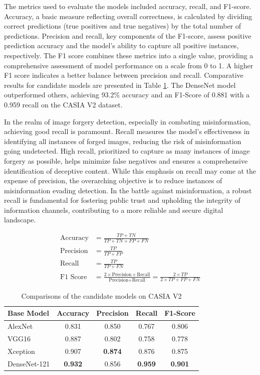The metrics used to evaluate the models included accuracy, recall, and F1-score. Accuracy, a basic measure reflecting overall correctness, is calculated by dividing correct predictions (true positives and true negatives) by the total number of predictions. Precision and recall, key components of the F1-score, assess positive prediction accuracy and the model's ability to capture all positive instances, respectively. The F1 score combines these metrics into a single value, providing a comprehensive assessment of model performance on a scale from 0 to 1. A higher F1 score indicates a better balance between precision and recall. Comparative results for candidate models are presented in Table \ref{table:Candidates}. The DenseNet model outperformed others, achieving 93.2\% accuracy and an F1-Score of 0.881 with a 0.959 recall on the CASIA V2 dataset.

In the realm of image forgery detection, especially in combating misinformation, achieving good recall is paramount. Recall measures the model's effectiveness in identifying all instances of forged images, reducing the risk of misinformation going undetected. High recall, prioritized to capture as many instances of image forgery as possible, helps minimize false negatives and ensures a comprehensive identification of deceptive content. While this emphasis on recall may come at the expense of precision, the overarching objective is to reduce instances of misinformation evading detection. In the battle against misinformation, a robust recall is fundamental for fostering public trust and upholding the integrity of information channels, contributing to a more reliable and secure digital landscape.


\begin{align*}
\text{Accuracy} & = \frac{TP + TN}{TP + TN + FP + FN} \\
\text{Precision} & = \frac{TP}{TP + FP} \\
\text{Recall} & = \frac{TP}{TP + FN} \\
\text{F1 Score} & = \frac{2 \times \text{Precision} \times \text{Recall}}{\text{Precision} + \text{Recall}} = \frac{2 \times TP}{2 \times TP + FP + FN}
\end{align*}

\begin{table}[!h]
\centering
\begin{tabular}{|l|c|c|c|c|}
\hline
Base Model & Accuracy & Precision & Recall & F1-Score \\
\hline
AlexNet & 0.831 & 0.850 & 0.767 & 0.806 \\ \hline
VGG16 & 0.887 & 0.802 & 0.758 & 0.778 \\ \hline
Xception & 0.907 & \textbf{0.874} & 0.876 & 0.875 \\ \hline
DenseNet-121 & \textbf{0.932} & 0.856 & \textbf{0.959} & \textbf{0.901} \\ \hline
\end{tabular}
\caption{Comparisons of the candidate models on CASIA V2}
\label{table:Candidates}
\end{table}


